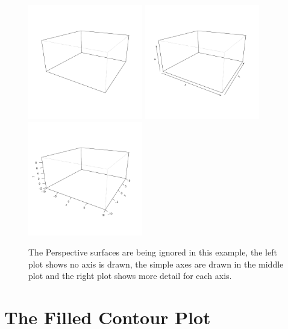 \documentclass[11pt,twoside]{report}
\begin{document}
\begin{figure}[h]
	\begin{center}
		\includegraphics[height = 5cm, width = 5cm]{figure/axis_example_1.pdf}
		\includegraphics[height = 5cm, width = 5cm]{figure/axis_example_2.pdf}
		\includegraphics[height = 5cm, width = 5cm]{figure/axis_example_3.pdf}
		\caption{The Perspective surfaces are being ignored in this example, the left plot shows no axis is drawn, the simple axes are drawn in the middle plot and the right plot shows more detail for each axis.}
		\label{figure_3.5}
	\end{center}
\end{figure}

\newpage
\section{The Filled Contour Plot}
\end{document}
